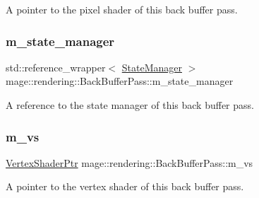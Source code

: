 A pointer to the pixel shader of this back buffer pass. \hypertarget{classmage_1_1rendering_1_1_back_buffer_pass_a5d10a44c5f8a3529d64aabfb590156f2}{}\label{classmage_1_1rendering_1_1_back_buffer_pass_a5d10a44c5f8a3529d64aabfb590156f2} 
\subsubsection{\texorpdfstring{m\+\_\+state\+\_\+manager}{m\_state\_manager}}
{\footnotesize\ttfamily std\+::reference\+\_\+wrapper$<$ \hyperlink{classmage_1_1rendering_1_1_state_manager}{State\+Manager} $>$ mage\+::rendering\+::\+Back\+Buffer\+Pass\+::m\+\_\+state\+\_\+manager\hspace{0.3cm}{\ttfamily [private]}}

A reference to the state manager of this back buffer pass. \hypertarget{classmage_1_1rendering_1_1_back_buffer_pass_a12a95cc800090a0bc01d14a9f5903748}{}\label{classmage_1_1rendering_1_1_back_buffer_pass_a12a95cc800090a0bc01d14a9f5903748} 
\subsubsection{\texorpdfstring{m\+\_\+vs}{m\_vs}}
{\footnotesize\ttfamily \hyperlink{namespacemage_1_1rendering_aaf704b9c54a4181f4950a1761de69dda}{Vertex\+Shader\+Ptr} mage\+::rendering\+::\+Back\+Buffer\+Pass\+::m\+\_\+vs\hspace{0.3cm}{\ttfamily [private]}}

A pointer to the vertex shader of this back buffer pass. 